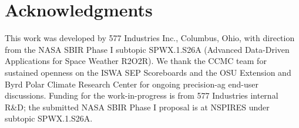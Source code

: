 \documentclass[11pt,letterpaper]{article}
\begin{document}
\section*{Acknowledgments}

This work was developed by 577 Industries Inc., Columbus, Ohio, with
direction from the NASA SBIR Phase I subtopic SPWX.1.S26A
(Advanced Data-Driven Applications for Space Weather R2O2R).  We thank
the CCMC team for sustained openness on the ISWA SEP Scoreboards
\cite{ccmc_iswa,whitman2024} and the OSU Extension and Byrd Polar Climate
Research Center for ongoing precision-ag end-user discussions.  Funding for
the work-in-progress is from 577 Industries internal R\&D; the submitted
NASA SBIR Phase I proposal is at NSPIRES under subtopic SPWX.1.S26A.



\end{document}
